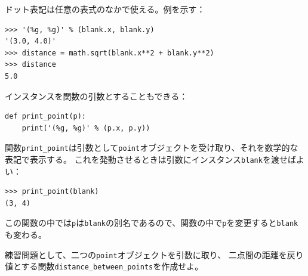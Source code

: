 \documentclass[a4j,12pt,makeidx]{jbook}
\begin{document}
ドット表記は任意の表式のなかで使える。例を示す：
\begin{verbatim}
>>> '(%g, %g)' % (blank.x, blank.y)
'(3.0, 4.0)'
>>> distance = math.sqrt(blank.x**2 + blank.y**2)
>>> distance
5.0
\end{verbatim} \par
インスタンスを関数の引数とすることもできる：
\begin{verbatim}
def print_point(p):
    print('(%g, %g)' % (p.x, p.y))
\end{verbatim}
関数{\tt print\_point}は引数として{\tt point}オブジェクトを受け取り、それを数学的な表記で表示する。
これを発動させるときは引数にインスタンス{\tt blank}を渡せばよい：
\begin{verbatim}
>>> print_point(blank)
(3, 4)
\end{verbatim} \par
この関数の中では{\tt p}は{\tt blank}の別名であるので、関数の中で{\tt p}を変更すると{\tt blank}も変わる。\par
練習問題として、二つの{\tt point}オブジェクトを引数に取り、
二点間の距離を戻り値とする関数{\tt distance\_between\_points}を作成せよ。
%
\end{document}
